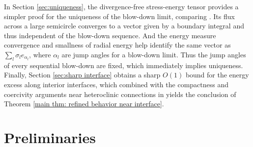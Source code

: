 \documentclass[leqno,11pt]{amsart}
\let\al=\alpha
\theoremstyle{remark}
\begin{document}
In Section \ref{sec:uniqueness}, the divergence-free stress-energy tensor provides a simpler proof for the uniqueness of the blow-down limit, comparing \cite{geng2025uniqueness}. Its flux across a large semicircle converges to a vector given by a boundary integral and thus independent of the blow-down sequence. And the energy measure convergence and smallness of radial energy help identify the same vector as $\sum_{l}\sigma_{l}e_{\alpha_{l}}$, where $\al_l$ are jump angles for a blow-down limit. Thus the jump angles of every sequential blow-down are fixed, which immediately implies uniqueness. Finally, Section \ref{sec:sharp interface} obtains a sharp $O(1)$ bound for the energy excess along interior interfaces, which combined with the compactness and coercivity arguments near heteroclinic connections in \cite{schatzman2002asymmetric} yields the conclusion of Theorem \ref{main thm: refined behavior near interface}. 



\section{Preliminaries}\label{sec:prelim}
\end{document}
